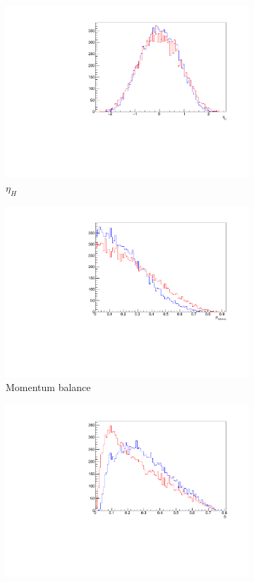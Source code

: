 \begin{figure}[htbp]
\begin{subfigure}[b]{0.25\textwidth}
	                \includegraphics[width=\textwidth]{img/etah}
	                \caption{$\eta_H$}
	                \label{fig:etah}
	\end{subfigure}
	\begin{subfigure}[b]{0.25\textwidth}
	                \includegraphics[width=\textwidth]{img/pbalance}
	                \caption{Momentum balance}
	                \label{fig:pbal}
	\end{subfigure}
	\begin{subfigure}[b]{0.25\textwidth}
	                \includegraphics[width=\textwidth]{img/sphericity}

\end{subfigure}
\end{figure}
